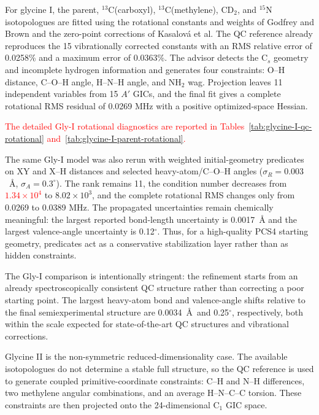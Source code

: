 \documentclass[aip,jcp,reprint,longbibliography,floatfix]{revtex4-2}
\newcommand{\rev}[1]{\textcolor{red}{#1}}
\begin{document}
For glycine I, the parent, $^{13}$C(carboxyl), $^{13}$C(methylene), CD$_2$,
and $^{15}$N isotopologues are fitted using the rotational constants and
weights of Godfrey and Brown\cite{GodfreyBrown1995ShapeGlycine} and the
zero-point corrections of Kasalov{\'a} et al.\cite{Kasalova2007Glycine} The
QC reference already reproduces the 15 vibrationally corrected constants
with an RMS relative error of 0.0258\% and a maximum error of 0.0363\%. The
advisor detects the C$_s$ geometry and incomplete hydrogen information and
generates four constraints: O--H distance, C--O--H angle, H--N--H angle, and
NH$_2$ wag. Projection leaves 11 independent variables from 15 $A'$ GICs, and
the final fit gives a complete rotational RMS residual of 0.0269 MHz with a
positive optimized-space Hessian.

\rev{The detailed Gly-I rotational diagnostics are reported in Tables~\ref{tab:glycine-I-qc-rotational} and~\ref{tab:glycine-I-parent-rotational}.}


The same Gly-I model was also rerun with weighted initial-geometry predicates
on XY and X--H distances and selected heavy-atom/C--O--H angles
($\sigma_R=0.003$~\AA{}, $\sigma_A=0.3^\circ$). The rank remains 11, the
condition number decreases from \rev{$1.34\times10^4$} to $8.02\times10^3$, and the
complete rotational RMS changes only from 0.0269 to 0.0389 MHz. The propagated
uncertainties remain chemically meaningful: the largest reported bond-length
uncertainty is 0.0017~\AA{} and the largest valence-angle uncertainty is
0.12$^\circ$. Thus, for a high-quality PCS4 starting geometry, predicates act
as a conservative stabilization layer rather than as hidden constraints.

The Gly-I comparison is intentionally stringent: the refinement starts from an
already spectroscopically consistent QC structure rather than correcting a poor
starting point. The largest heavy-atom bond and valence-angle shifts relative
to the final semiexperimental structure are 0.0034~\AA\ and 0.25$^\circ$,
respectively, both within the scale expected for state-of-the-art QC structures
and vibrational corrections.\cite{PuzzariniStanton2023,Mendolicchio2025FastDvib}

Glycine II is the non-symmetric reduced-dimensionality case. The available
isotopologues do not determine a stable full structure, so the QC reference
is used to generate coupled primitive-coordinate constraints: C--H and N--H
differences, two methylene angular combinations, and an average H--N--C--C
torsion. These constraints are then projected onto the
24-dimensional C$_1$ GIC space.
\end{document}
